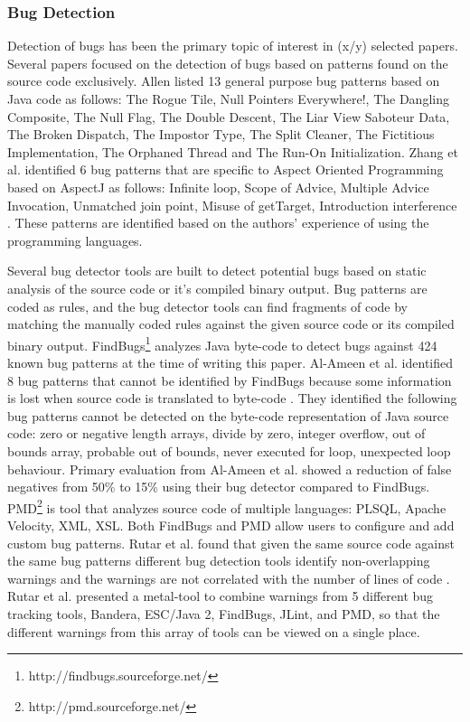 \documentclass[conference]{IEEEtran}
\begin{document}
\subsubsection{Bug Detection} Detection of bugs has been the primary topic of interest in (x/y) selected papers. Several papers focused on the detection of bugs based on patterns found on the source code exclusively. Allen listed 13 general purpose bug patterns based on Java code as follows: The Rogue Tile, Null Pointers Everywhere!, The Dangling Composite, The Null Flag, The Double Descent, The Liar View Saboteur Data, The Broken Dispatch, The Impostor Type, The Split Cleaner, The Fictitious Implementation, The Orphaned Thread and The Run-On Initialization\cite{bug_patterns_allen}. Zhang et al. identified 6 bug patterns that are specific to Aspect Oriented Programming based on AspectJ as follows: Infinite loop, Scope of Advice, Multiple Advice Invocation, Unmatched join point, Misuse of getTarget, Introduction interference \cite{on_identifying_zhang}. These patterns are identified based on the authors' experience of using the programming languages.

Several bug detector tools are built to detect potential bugs based on static analysis of the source code or it's compiled binary output. Bug patterns are coded as rules, and the bug detector tools can find fragments of code by matching the manually coded rules against the given source code or its compiled binary output. FindBugs\footnote{http://findbugs.sourceforge.net/} analyzes Java byte-code to detect bugs against 424 known bug patterns at the time of writing this paper. Al-Ameen et al. identified 8 bug patterns that cannot be identified by FindBugs because some information is lost when source code is translated to byte-code \cite{making_al_ameen}. They identified the following bug patterns cannot be detected on the byte-code representation of Java source code: zero or negative length arrays, divide by zero, integer overflow, out of bounds array, probable out of bounds, never executed for loop, unexpected loop behaviour. Primary evaluation from Al-Ameen et al. showed a reduction of false negatives from 50\% to 15\% using their bug detector compared to FindBugs. PMD\footnote{http://pmd.sourceforge.net/} is tool that analyzes source code of multiple languages: PLSQL, Apache Velocity, XML, XSL. Both FindBugs and PMD allow users to configure and add custom bug patterns. Rutar et al. found that given the same source code against the same bug patterns different bug detection tools identify non-overlapping warnings and the warnings are not correlated with the number of lines of code \cite{comparison_Rutar}. Rutar et al. presented a metal-tool to combine warnings from 5 different bug tracking tools, Bandera, ESC/Java 2, FindBugs, JLint, and PMD, so that the different warnings from this array of tools can be viewed on a single place.
\end{document}
